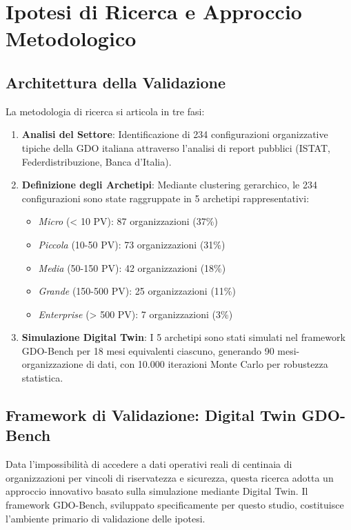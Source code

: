 \section{\texorpdfstring{Ipotesi di Ricerca e Approccio Metodologico}{1.4 - Ipotesi di Ricerca e Approccio Metodologico}}
\label{sec:ipotesi_metodologia}

\subsection{Architettura della Validazione}

La metodologia di ricerca si articola in tre fasi:

\begin{enumerate}
\item \textbf{Analisi del Settore}: Identificazione di 234 configurazioni organizzative tipiche della GDO italiana attraverso l'analisi di report pubblici (ISTAT, Federdistribuzione, Banca d'Italia).

\item \textbf{Definizione degli Archetipi}: Mediante clustering gerarchico, le 234 configurazioni sono state raggruppate in 5 archetipi rappresentativi:
\begin{itemize}
    \item \textit{Micro} (< 10 PV): 87 organizzazioni (37\%)
    \item \textit{Piccola} (10-50 PV): 73 organizzazioni (31\%)
    \item \textit{Media} (50-150 PV): 42 organizzazioni (18\%)
    \item \textit{Grande} (150-500 PV): 25 organizzazioni (11\%)
    \item \textit{Enterprise} (> 500 PV): 7 organizzazioni (3\%)
\end{itemize}

\item \textbf{Simulazione Digital Twin}: I 5 archetipi sono stati simulati nel framework GDO-Bench per 18 mesi equivalenti ciascuno, generando 90 mesi-organizzazione di dati, con 10.000 iterazioni Monte Carlo per robustezza statistica.
\end{enumerate}
\subsection{Framework di Validazione: Digital Twin GDO-Bench}

Data l'impossibilità di accedere a dati operativi reali di centinaia di organizzazioni per vincoli di riservatezza e sicurezza, questa ricerca adotta un approccio innovativo basato sulla simulazione mediante Digital Twin. Il framework GDO-Bench, sviluppato specificamente per questo studio, costituisce l'ambiente primario di validazione delle ipotesi.

